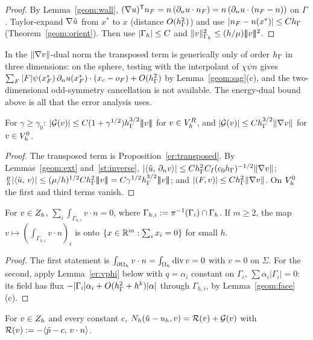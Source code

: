 \begin{proof}
By Lemma~\ref{geom:wall}, $(\nabla u)^{\mathsf T}n_F=n\,(\partial_n u\cdot n_F)=n\,(\partial_n u\cdot(n_F-n))$ on $\Gamma$. Taylor-expand $\nabla\tilde u$ from $x^\ast$ to $x$ (distance $O(h_\Gamma^2)$) and use $|n_F-n(x^\ast)|\le Ch_\Gamma$ (Theorem~\ref{geom:orient}). Then use $|\Gamma_h|\le C$ and $\lVert v\rVert^2_{\Gamma_h}\le(h/\mu)|\!|\!|v|\!|\!|^2$.
\end{proof}

In the $\lVert \nabla v\rVert$-dual norm the transposed term is generically only of order $h_\Gamma$ in three dimensions: on the sphere, testing with the interpolant of $\chi\psi n$ gives $\sum_F|F|\psi(x_F^\ast)\,\partial_n u(x_F^\ast)\cdot(x_c-o_F)+O(h_\Gamma^2)$ by Lemma~\ref{geom:sag}(c), and the two-dimensional odd-symmetry cancellation is not available. The energy-dual bound above is all that the error analysis uses.

\begin{lemma}\label{er:G}
For $\gamma\ge\gamma_0$: $|\mathcal G(v)|\le C(1+\gamma^{1/2})h_\Gamma^{3/2}|\!|\!|v|\!|\!|$ for $v\in V_h^R$, and $|\mathcal G(v)|\le Ch_\Gamma^{3/2}\lVert \nabla v\rVert$ for $v\in V_h^0$.
\end{lemma}

\begin{proof}
The transposed term is Proposition~\ref{er:transposed}. By Lemmas~\ref{geom:ext} and~\ref{st:inverse}, $|\langle \tilde u,\, \partial_n v\rangle|\le Ch_\Gamma^2C_I(c_0h_\Gamma)^{-1/2}\lVert \nabla v\rVert$; $\frac\mu h|\ip\ut v|\le(\mu/h)^{1/2}C\hG^2\tnorm v=C\gamma^{1/2}\hG^{3/2}\tnorm v$; and $|(F,v)|\le Ch_\Gamma^2\lVert \nabla v\rVert$. On $V_h^0$ the first and third terms vanish.
\end{proof}

\begin{lemma}[Fluxes]\label{er:flux}
For $v\in Z_h$, $\sum_i\int_{\Gamma_{h,i}}v\cdot n=0$, where $\Gamma_{h,i}:=\pi^{-1}(\Gamma_i)\cap\Gamma_h$. If $m\ge2$, the map $v\mapsto(\int_{\Gamma_{h,i}}v\cdot n)_i$ is onto $\{x\in\mathbb R^m:\sum_ix_i=0\}$ for small $h$.
\end{lemma}

\begin{proof}
The first statement is $\int_{\partial\Omega_h}v\cdot n=\int_{\Omega_h}\operatorname{div} v=0$ with $v=0$ on $\Sigma$. For the second, apply Lemma~\ref{er:vphi} below with $q=\alpha_i$ constant on $\Gamma_i$, $\sum\alpha_i|\Gamma_i|=0$: its field has flux $-|\Gamma_i|\alpha_i+O(h_\Gamma^2+h^k)|\alpha|$ through $\Gamma_{h,i}$, by Lemma~\ref{geom:face}(c).
\end{proof}

\begin{corollary}[$\GS$ on $\Zh$]\label{er:GSZ}
For $v\in Z_h$ and every constant $c$, $N_h(\tilde u-u_h,v)=\mathcal R(v)+\mathcal G(v)$ with $\mathcal R(v):=-\langle \tilde p-c,\, v\cdot n\rangle$.
\end{corollary}

